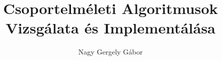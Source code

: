 \documentclass[dvips,a4paper,twoside,12pt]{article}
\numberwithin{equation}{subsection}
\begin{document}
\title{Csoportelméleti Algoritmusok Vizsgálata és Implementálása}
\author{Nagy Gergely Gábor}
\maketitle

\tableofcontents
{}
\clearpage





\nocite{*}


\clearpage

\todototoc
\listoftodos
\end{document}
